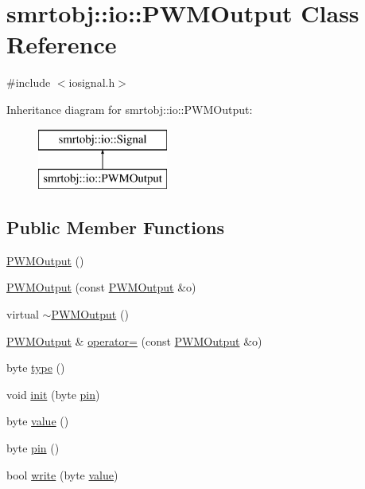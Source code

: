 \hypertarget{classsmrtobj_1_1io_1_1_p_w_m_output}{}\section{smrtobj\+:\+:io\+:\+:P\+W\+M\+Output Class Reference}
\label{classsmrtobj_1_1io_1_1_p_w_m_output}


{\ttfamily \#include $<$iosignal.\+h$>$}

Inheritance diagram for smrtobj\+:\+:io\+:\+:P\+W\+M\+Output\+:\begin{figure}[H]
\begin{center}
\leavevmode
\includegraphics[height=2.000000cm]{classsmrtobj_1_1io_1_1_p_w_m_output}
\end{center}
\end{figure}
\subsection*{Public Member Functions}
\begin{DoxyCompactItemize}
\item 
\hyperlink{classsmrtobj_1_1io_1_1_p_w_m_output_adea97b12a8895b84b9cc0a056520770c}{P\+W\+M\+Output} ()
\item 
\hyperlink{classsmrtobj_1_1io_1_1_p_w_m_output_a848a4fc96ebdbb579d34b63fb152dfdd}{P\+W\+M\+Output} (const \hyperlink{classsmrtobj_1_1io_1_1_p_w_m_output}{P\+W\+M\+Output} \&o)
\item 
virtual \hyperlink{classsmrtobj_1_1io_1_1_p_w_m_output_aaf792a72ce1d9de754fce790f852b5c3}{$\sim$\+P\+W\+M\+Output} ()
\item 
\hyperlink{classsmrtobj_1_1io_1_1_p_w_m_output}{P\+W\+M\+Output} \& \hyperlink{classsmrtobj_1_1io_1_1_p_w_m_output_ad204d0cf31273a0160914de56a1c3b0c}{operator=} (const \hyperlink{classsmrtobj_1_1io_1_1_p_w_m_output}{P\+W\+M\+Output} \&o)
\item 
byte \hyperlink{classsmrtobj_1_1io_1_1_p_w_m_output_ac5908c2317a1e2e7a293f8ee04d42a77}{type} ()
\item 
void \hyperlink{classsmrtobj_1_1io_1_1_p_w_m_output_a10f8b63f2769f41df9abde0872ef209f}{init} (byte \hyperlink{classsmrtobj_1_1io_1_1_p_w_m_output_a310d81c32649b121c6a2b02173986e96}{pin})
\item 
byte \hyperlink{classsmrtobj_1_1io_1_1_p_w_m_output_a19bc1ccc705b00198425c587e433b2d9}{value} ()
\item 
byte \hyperlink{classsmrtobj_1_1io_1_1_p_w_m_output_a310d81c32649b121c6a2b02173986e96}{pin} ()
\item 
bool \hyperlink{classsmrtobj_1_1io_1_1_p_w_m_output_ac49273d0fbe3419c064509a068e6e667}{write} (byte \hyperlink{classsmrtobj_1_1io_1_1_p_w_m_output_a19bc1ccc705b00198425c587e433b2d9}{value})
\end{DoxyCompactItemize}
